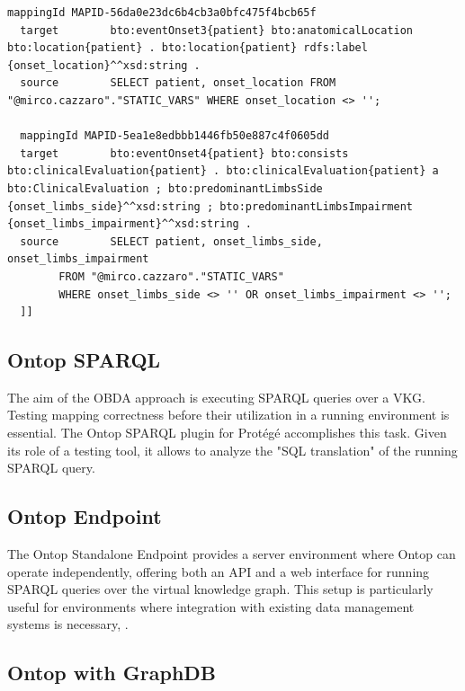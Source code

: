 \begin{lstlisting}[language=OntopNative, caption={Mappings definition between the virtual relational schema exposed by Dremio and the Brainteaser Ontology}, label={lst:mappings}]
  mappingId	MAPID-56da0e23dc6b4cb3a0bfc475f4bcb65f
  target		bto:eventOnset3{patient} bto:anatomicalLocation bto:location{patient} . bto:location{patient} rdfs:label {onset_location}^^xsd:string . 
  source		SELECT patient, onset_location FROM "@mirco.cazzaro"."STATIC_VARS" WHERE onset_location <> '';

  mappingId	MAPID-5ea1e8edbbb1446fb50e887c4f0605dd
  target		bto:eventOnset4{patient} bto:consists bto:clinicalEvaluation{patient} . bto:clinicalEvaluation{patient} a bto:ClinicalEvaluation ; bto:predominantLimbsSide {onset_limbs_side}^^xsd:string ; bto:predominantLimbsImpairment {onset_limbs_impairment}^^xsd:string . 
  source		SELECT patient, onset_limbs_side, onset_limbs_impairment
        FROM "@mirco.cazzaro"."STATIC_VARS"
        WHERE onset_limbs_side <> '' OR onset_limbs_impairment <> '';
  ]]
\end{lstlisting}

\subsection{Ontop SPARQL}
The aim of the OBDA approach is executing \ac{SPARQL} queries over a \ac{VKG}. Testing mapping correctness before their utilization in a running environment is essential. The Ontop SPARQL plugin for Protégé accomplishes this task. Given its role of a testing tool, it allows to analyze the "\ac{SQL} translation" of the running \ac{SPARQL} query.
\subsection{Ontop Endpoint}
The Ontop Standalone Endpoint provides a server environment where Ontop can operate independently, offering both an API and a web interface for running SPARQL queries over the virtual knowledge graph. This setup is particularly useful for environments where integration with existing data management systems is necessary, .
\subsection{Ontop with GraphDB}
